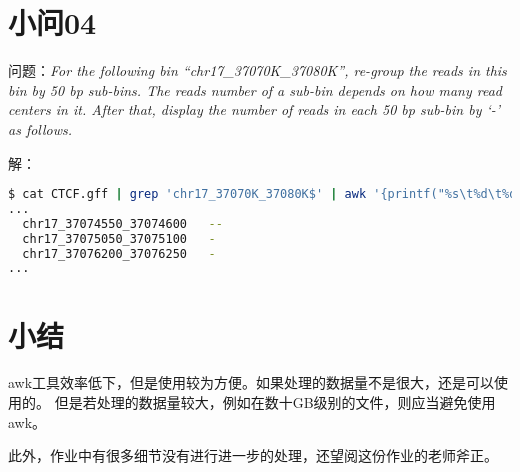 \documentclass[cn,black,11pt,normal]{elegantnote}
\begin{document}
\section{小问04}
问题：\textit{For the following bin “chr17\_37070K\_37080K”, re-group the reads in this bin by 50 bp sub-bins. 
The reads number of a sub-bin depends on how many read centers in it. After that, display the number of reads in each 50 bp sub-bin by ‘-’ as follows.}


解：
\begin{lstlisting}[language=bash]
$ cat CTCF.gff | grep 'chr17_37070K_37080K$' | awk '{printf("%s\t%d\t%d\n",$1,$4/50,($5-1)/50+1)}' | awk '{printf("%s\t%d\t%d\n",$1,$2*50,$3*50)}' | sort | uniq -c |  awk '{printf("%s_%d_%d\t",$2,$3,$4);for(i=1;i<=$1;i++){printf("-")};printf("\n")}'
...
  chr17_37074550_37074600	--
  chr17_37075050_37075100	-
  chr17_37076200_37076250	-
...
\end{lstlisting}



\section{小结}
awk工具效率低下，但是使用较为方便。如果处理的数据量不是很大，还是可以使用的。
但是若处理的数据量较大，例如在数十GB级别的文件，则应当避免使用awk。

此外，作业中有很多细节没有进行进一步的处理，还望阅这份作业的老师斧正。
\end{document}

